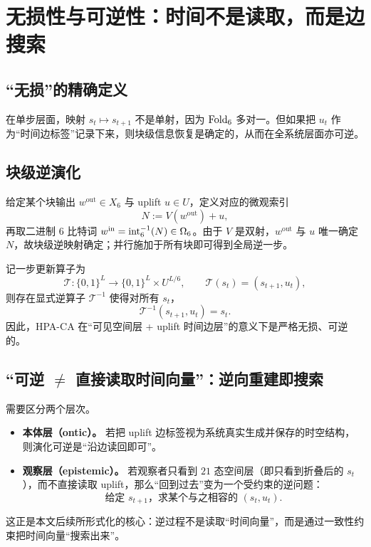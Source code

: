 
\section{无损性与可逆性：时间不是读取，而是边搜索}

\subsection{“无损”的精确定义}

在单步层面，映射 $s_t\mapsto s_{t+1}$ 不是单射，因为 $\mathrm{Fold}_6$ 多对一。但如果把 $u_t$ 作为“时间边标签”记录下来，则块级信息恢复是确定的，从而在全系统层面亦可逆。

\subsection{块级逆演化}

给定某个块输出 $w^{\mathrm{out}}\in X_6$ 与 uplift $u\in U$，定义对应的微观索引
$$
N:=V(w^{\mathrm{out}})+u,
$$
再取二进制 $6$ 比特词 $w^{\mathrm{in}}=\mathrm{int}_6^{-1}(N)\in\Omega_6$。由于 $V$ 是双射，$w^{\mathrm{out}}$ 与 $u$ 唯一确定 $N$，故块级逆映射确定；并行施加于所有块即可得到全局逆一步。

\begin{proposition}[扩展态下一步可逆性]
记一步更新算子为
$$
\mathcal{T}:\{0,1\}^L\to\{0,1\}^L\times U^{L/6},\qquad \mathcal{T}(s_t)=(s_{t+1},u_t),
$$
则存在显式逆算子 $\mathcal{T}^{-1}$ 使得对所有 $s_t$，
$$
\mathcal{T}^{-1}(s_{t+1},u_t)=s_t.
$$
因此，HPA-CA 在“可见空间层 + uplift 时间边层”的意义下是严格无损、可逆的。
\end{proposition}

\subsection{“可逆 $\neq$ 直接读取时间向量”：逆向重建即搜索}

需要区分两个层次。
\begin{itemize}
  \item \textbf{本体层（ontic）。} 若把 uplift 边标签视为系统真实生成并保存的时空结构，则演化可逆是“沿边读回即可”。
  \item \textbf{观察层（epistemic）。} 若观察者只看到 $21$ 态空间层（即只看到折叠后的 $s_t$），而不直接读取 uplift，那么“回到过去”变为一个受约束的逆问题：
  $$\text{给定 }s_{t+1}\text{，求某个与之相容的 }(s_t,u_t).$$
\end{itemize}

这正是本文后续所形式化的核心：逆过程不是读取“时间向量”，而是通过一致性约束把时间向量“搜索出来”。

